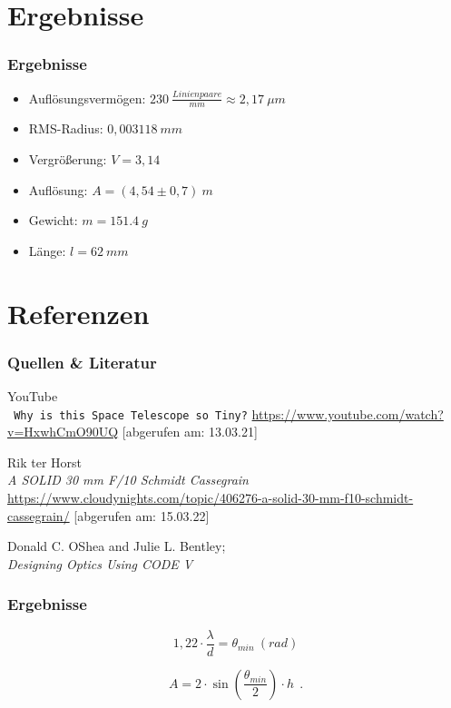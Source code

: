 \documentclass{beamer}
\begin{document}
\section{Ergebnisse}
\begin{frame}
	\frametitle{Ergebnisse}

 \begin{itemize}
 	\item Auflösungsvermögen: $230 ~\frac{Linienpaare}{mm}  \approx 2,17~\mu m$\pause
 	\item RMS-Radius:  $0,003118~mm$ \pause
 	\item Vergrößerung: $V=3,14 $  \pause
 	\item Auflösung: $A=(4,54\pm0,7)~m$\pause
 	\item Gewicht: $m = 151.4~g$ \pause
 	\item Länge: $l =  62 ~mm$
 	 
 \end{itemize}
\end{frame}



\section[Quellen]{Referenzen}
\begin{frame}\frametitle{Quellen \& Literatur}

	\begin{thebibliography}{9}
		
		YouTube
		\\\texttt{ Why is this Space Telescope so Tiny?}
		\url{https://www.youtube.com/watch?v=HxwhCmO90UQ}
		[abgerufen am: 13.03.21]
		
		
		Rik ter Horst
		\\\textit{ A SOLID 30 mm F/10 Schmidt Cassegrain} \url{https://www.cloudynights.com/topic/406276-a-solid-30-mm-f10-schmidt-cassegrain/} [abgerufen am: 15.03.22]
		
	    Donald C. O{\textquotesingle}Shea and Julie L. Bentley;
		\\\textit{Designing Optics Using {CODE} V} 
	 
		
	\end{thebibliography}

\end{frame}


\begin{frame}
	\frametitle{Ergebnisse}
	

\begin{minipage}{0.45\textwidth}
		\begin{equation}
			1,22\cdot\dfrac{\lambda}{d}=\theta_{min}~(rad)	
		\label{f2}
	\end{equation}
\end{minipage}
\begin{minipage}{0.1\textwidth}
\end{minipage}
\begin{minipage}{0.45\textwidth}
	\begin{equation}
	A=2\cdot\sin\left(\frac{\theta_{min}}{2}\right)\cdot h	~~.
	\label{f3}
	\end{equation}
\end{minipage}
\end{frame}
\end{document}
